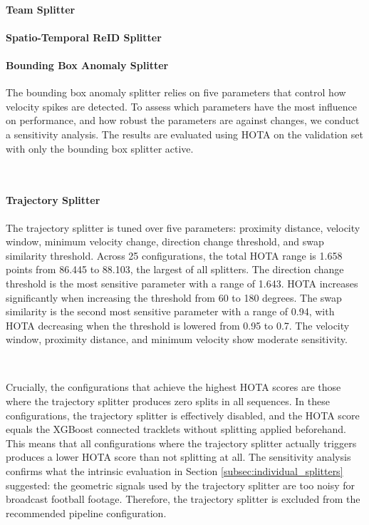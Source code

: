 \paragraph{Team Splitter}

\paragraph{Spatio-Temporal ReID Splitter}


\paragraph{Bounding Box Anomaly Splitter}
The bounding box anomaly splitter relies on five parameters that control how velocity spikes are detected. To assess which parameters have the most influence on performance, and how robust the parameters are against changes, we conduct a sensitivity analysis. The results are evaluated  using HOTA on the validation set with only the bounding box splitter active.

\


\paragraph{Trajectory Splitter}
The trajectory splitter is tuned over five parameters: proximity distance, velocity window, minimum velocity change, direction change threshold, and swap similarity threshold. Across 25 configurations, the total HOTA range is 1.658 points from 86.445 to 88.103, the largest of all splitters. The direction change threshold is the most sensitive parameter with a range of 1.643. HOTA increases significantly when increasing the threshold from 60 to 180 degrees. The swap similarity is the second most sensitive parameter with a range of 0.94, with HOTA decreasing when the threshold is lowered from 0.95 to 0.7. The velocity window, proximity distance, and minimum velocity show moderate sensitivity. 

\

Crucially, the configurations that achieve the highest HOTA scores are those where the trajectory splitter produces zero splits in all sequences. In these configurations, the trajectory splitter is effectively disabled, and the HOTA score equals the XGBoost connected tracklets without splitting applied beforehand. This means that all configurations where the trajectory splitter actually triggers produces a lower HOTA score than not splitting at all. The sensitivity analysis confirms what the intrinsic evaluation in Section \ref{subsec:individual_splitters} suggested: the geometric signals used by the trajectory splitter are too noisy for broadcast football footage. Therefore, the trajectory splitter is excluded from the recommended pipeline configuration. 



